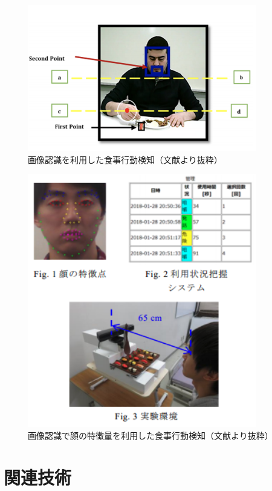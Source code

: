 \begin{figure}[htbp]
  \caption{画像認識を利用した食事行動検知（文献\cite{vb_fi_monitor_alzheimer}より抜粋）}
  \label{fig:vb_fi_monitor_alzheimer}
  \begin{center}
    \includegraphics[bb=0 0 1000 500,width=10cm]{assets/vb_fi_monitor_alzheimer.png}
  \end{center}
\end{figure}

\begin{figure}[htbp]
  \caption{画像認識で顔の特徴量を利用した食事行動検知（文献\cite{detect_chewing_jp}より抜粋）}
  \label{fig:detect_chewing_jp}
  \begin{center}
    \includegraphics[bb=0 0 1000 400,width=10cm]{assets/detect_chewing_jp.png}
  \end{center}
\end{figure}

\section{関連技術}

